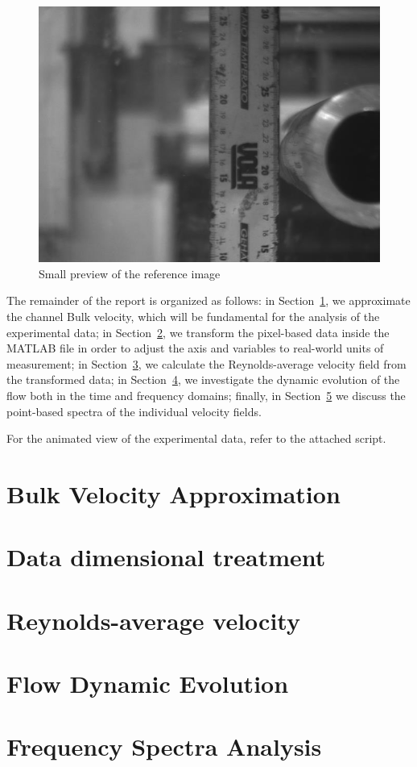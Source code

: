 \documentclass[12pt]{article}
\begin{document}
        \begin{figure}[ht!]
                \centering
                \includegraphics[width=\textwidth]{Reference.png}
                \caption{Small preview of the reference image}
                \label{fig:reference}
        \end{figure}

        The remainder of the report is organized as follows: in Section~\ref{sec:bulk_velocity}, we approximate the channel Bulk velocity, which will be fundamental for the analysis of the experimental data; in Section~\ref{sec:dimensional}, we transform the pixel-based data inside the MATLAB file in order to adjust the axis and variables to real-world units of measurement; in Section~\ref{sec:RANS}, we calculate the Reynolds-average velocity field from the transformed data; in Section~\ref{sec:dynamics}, we investigate the dynamic evolution of the flow both in the time and frequency domains; finally, in Section~\ref{sec:spectra} we discuss the point-based spectra of the individual velocity fields.

        For the animated view of the experimental data, refer to the attached script.

\section{Bulk Velocity Approximation} \label{sec:bulk_velocity}

\section{Data dimensional treatment} \label{sec:dimensional}

\section{Reynolds-average velocity} \label{sec:RANS}

\section{Flow Dynamic Evolution} \label{sec:dynamics}

\section{Frequency Spectra Analysis} \label{sec:spectra}



\end{document}

